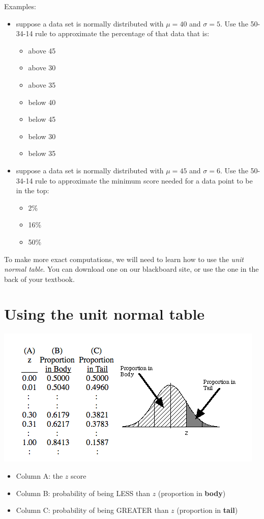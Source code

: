 \documentclass[11pt]{article}
\begin{document}
Examples:
\begin{itemize}
\item suppose a data set is normally distributed with $\mu=40$ and $\sigma=5$.  Use the 50-34-14 rule to approximate the percentage of that data that is:
\begin{itemize}
\item above 45
\item above 30
\item above 35
\item below 40
\item below 45
\item below 30
\item below 35
\end{itemize}

\item suppose a data set is normally distributed with $\mu=45$ and $\sigma=6$.  Use the 50-34-14 rule to approximate the minimum score needed for a data point to be in the top:
\begin{itemize}
\item 2\%
\item 16\%
\item 50\%
\end{itemize}
\end{itemize}


To make more exact computations, we will need to learn how to use the \emph{unit normal table}.  You can download one on our blackboard site, or use the one in the back of your textbook.

\section*{Using the unit normal table}
\label{sec-4}

\includegraphics[width=.9\linewidth]{figures/week5/table.png}

\begin{itemize}
\item Column A: the $z$ score
\item Column B: probability of being LESS than $z$ (proportion in \textbf{body})
\item Column C: probability of being GREATER than $z$ (proportion in \textbf{tail})
\end{itemize}
\end{document}
